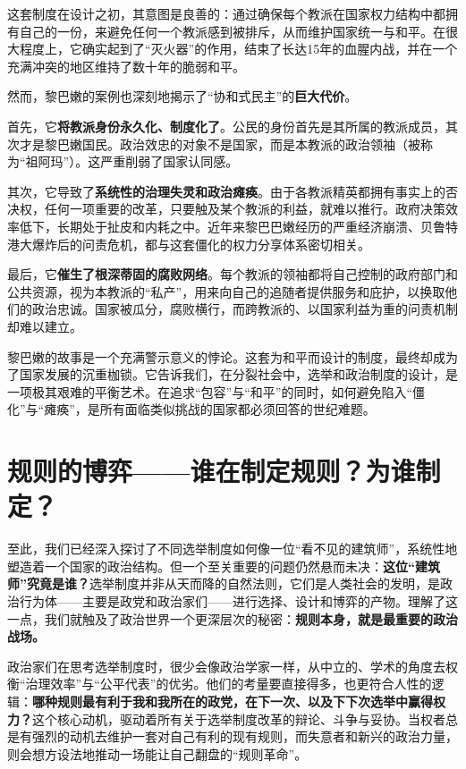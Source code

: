 这套制度在设计之初，其意图是良善的：通过确保每个教派在国家权力结构中都拥有自己的一份，来避免任何一个教派感到被排斥，从而维护国家统一与和平。在很大程度上，它确实起到了“灭火器”的作用，结束了长达15年的血腥内战，并在一个充满冲突的地区维持了数十年的脆弱和平。

然而，黎巴嫩的案例也深刻地揭示了“协和式民主”的\textbf{巨大代价}。

首先，它\textbf{将教派身份永久化、制度化了}。公民的身份首先是其所属的教派成员，其次才是黎巴嫩国民。政治效忠的对象不是国家，而是本教派的政治领袖（被称为“祖阿玛”）。这严重削弱了国家认同感。

其次，它导致了\textbf{系统性的治理失灵和政治瘫痪}。由于各教派精英都拥有事实上的否决权，任何一项重要的改革，只要触及某个教派的利益，就难以推行。政府决策效率低下，长期处于扯皮和内耗之中。近年来黎巴巴嫩经历的严重经济崩溃、贝鲁特港大爆炸后的问责危机，都与这套僵化的权力分享体系密切相关。

最后，它\textbf{催生了根深蒂固的腐败网络}。每个教派的领袖都将自己控制的政府部门和公共资源，视为本教派的“私产”，用来向自己的追随者提供服务和庇护，以换取他们的政治忠诚。国家被瓜分，腐败横行，而跨教派的、以国家利益为重的问责机制却难以建立。

黎巴嫩的故事是一个充满警示意义的悖论。这套为和平而设计的制度，最终却成为了国家发展的沉重枷锁。它告诉我们，在分裂社会中，选举和政治制度的设计，是一项极其艰难的平衡艺术。在追求“包容”与“和平”的同时，如何避免陷入“僵化”与“瘫痪”，是所有面临类似挑战的国家都必须回答的世纪难题。

\section{规则的博弈——谁在制定规则？为谁制定？}

至此，我们已经深入探讨了不同选举制度如何像一位“看不见的建筑师”，系统性地塑造着一个国家的政治结构。但一个至关重要的问题仍然悬而未决：\textbf{这位“建筑师”究竟是谁？}选举制度并非从天而降的自然法则，它们是人类社会的发明，是政治行为体——主要是政党和政治家们——进行选择、设计和博弈的产物。理解了这一点，我们就触及了政治世界一个更深层次的秘密：\textbf{规则本身，就是最重要的政治战场。}

政治家们在思考选举制度时，很少会像政治学家一样，从中立的、学术的角度去权衡“治理效率”与“公平代表”的优劣。他们的考量要直接得多，也更符合人性的逻辑：\textbf{哪种规则最有利于我和我所在的政党，在下一次、以及下下次选举中赢得权力？}这个核心动机，驱动着所有关于选举制度改革的辩论、斗争与妥协。当权者总是有强烈的动机去维护一套对自己有利的现有规则，而失意者和新兴的政治力量，则会想方设法地推动一场能让自己翻盘的“规则革命”。

